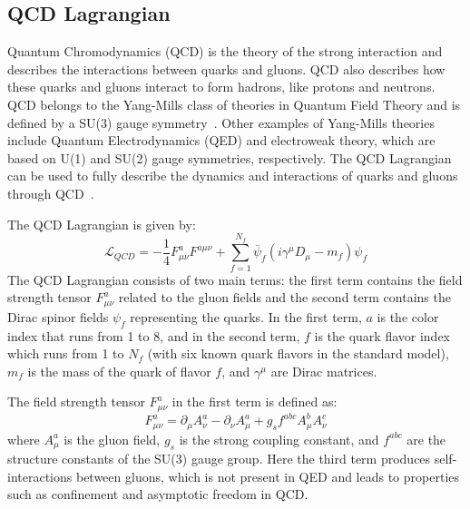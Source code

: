\subsection{QCD Lagrangian}
Quantum Chromodynamics (QCD) is the theory of the strong interaction and describes the interactions between quarks and gluons.
QCD also describes how these quarks and gluons interact to form hadrons, like protons and neutrons. 
QCD belongs to the Yang-Mills class of theories in Quantum Field Theory and is defined by a SU(3) gauge symmetry~\cite{Peskin:1995ev,yang_mills_1954}.
Other examples of Yang-Mills theories include Quantum Electrodynamics (QED) and electroweak theory, which are based on U(1) and SU(2) gauge symmetries, respectively.
The QCD Lagrangian can be used to fully describe the dynamics and interactions of quarks and gluons through QCD~\cite{Peskin:1995ev,ParticleDataGroup:2024cfk}.

The QCD Lagrangian is given by: 
\begin{equation}
    \mathcal{L}_{QCD} = -\frac{1}{4} F_{\mu\nu}^a F^{a\mu\nu} + \sum_{f=1}^{N_f} \bar{\psi}_f (i\gamma^\mu D_\mu - m_f) \psi_f
\end{equation}
The QCD Lagrangian consists of two main terms: the first term contains the field strength tensor $F_{\mu\nu}^a$ related to the gluon fields and the second term contains the Dirac spinor fields $\psi_f$ representing the quarks.
In the first term, $a$ is the color index that runs from 1 to 8, and in the second term, $f$ is the quark flavor index which runs from 1 to $N_f$ (with six known quark flavors in the standard model), $m_f$ is the mass of the quark of flavor $f$, and $\gamma^\mu$ are Dirac matrices. 

The field strength tensor $F_{\mu\nu}^a$ in the first term is defined as: 
\begin{equation}
    F_{\mu\nu}^a = \partial_\mu A_\nu^a - \partial_\nu A_\mu^a + g_s f^{abc} A_\mu^b A_\nu^c
\end{equation}
where $A_\mu^a$ is the gluon field, $g_s$ is the strong coupling constant, and $f^{abc}$ are the structure constants of the SU(3) gauge group.
Here the third term produces self-interactions between gluons, which is not present in QED and leads to properties such as confinement and asymptotic freedom in QCD.

